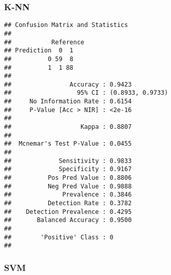 \documentclass[
]{article}
\newenvironment{Shaded}{\begin{snugshade}}{\end{snugshade}}
\newcommand{\AttributeTok}[1]{\textcolor[rgb]{0.77,0.63,0.00}{#1}}
\newcommand{\DecValTok}[1]{\textcolor[rgb]{0.00,0.00,0.81}{#1}}
\newcommand{\FunctionTok}[1]{\textcolor[rgb]{0.00,0.00,0.00}{#1}}
\newcommand{\NormalTok}[1]{#1}
\newcommand{\OtherTok}[1]{\textcolor[rgb]{0.56,0.35,0.01}{#1}}
\newcommand{\SpecialCharTok}[1]{\textcolor[rgb]{0.00,0.00,0.00}{#1}}
\begin{document}
\hypertarget{k-nn}{%
\subsubsection{K-NN}\label{k-nn}}

\begin{Shaded}
\end{Shaded}

\begin{verbatim}
## Confusion Matrix and Statistics
## 
##           Reference
## Prediction  0  1
##          0 59  8
##          1  1 88
##                                           
##                Accuracy : 0.9423          
##                  95% CI : (0.8933, 0.9733)
##     No Information Rate : 0.6154          
##     P-Value [Acc > NIR] : <2e-16          
##                                           
##                   Kappa : 0.8807          
##                                           
##  Mcnemar's Test P-Value : 0.0455          
##                                           
##             Sensitivity : 0.9833          
##             Specificity : 0.9167          
##          Pos Pred Value : 0.8806          
##          Neg Pred Value : 0.9888          
##              Prevalence : 0.3846          
##          Detection Rate : 0.3782          
##    Detection Prevalence : 0.4295          
##       Balanced Accuracy : 0.9500          
##                                           
##        'Positive' Class : 0               
## 
\end{verbatim}

\hypertarget{svm}{%
\subsubsection{SVM}\label{svm}}
\end{document}
